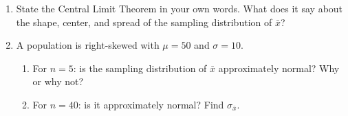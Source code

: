 \documentclass[10pt]{article}
\begin{document}
\namedateperiod

\vspace{0.15in}

\begin{enumerate}

  \item State the Central Limit Theorem in your own words. What does it say about the
        shape, center, and spread of the sampling distribution of $\bar{x}$?

  \item A population is right-skewed with $\mu = 50$ and $\sigma = 10$.
        \begin{enumerate}[label=\alph*.]
          \item For $n = 5$: is the sampling distribution of $\bar{x}$ approximately normal?
                Why or why not?
          \item For $n = 40$: is it approximately normal? Find $\sigma_{\bar{x}}$.
                \vspace{0.6in}
        \end{enumerate}

\end{enumerate}
\end{document}
